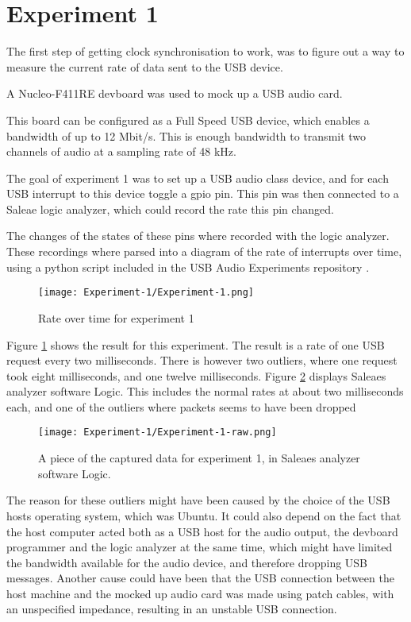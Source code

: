 \section{Experiment 1}

The first step of getting clock synchronisation to work, was to figure
out a way to measure the current rate of data sent to the USB device.

A Nucleo-F411RE devboard was used to mock up a USB audio card. 


This board can be configured as a Full Speed USB device, which enables a
bandwidth of up to 12 Mbit/s. This is enough bandwidth to transmit two
channels of audio at a sampling rate of 48 kHz.

The goal of experiment 1 was to set up a USB audio class device, and
for each USB interrupt to this device toggle a \acrshort{gpio} pin.
This pin was then connected to a Saleae logic analyzer, which could
record the rate this pin changed.

The changes of the states of these pins where recorded with the logic
analyzer. These recordings where parsed into a diagram of the rate of
interrupts over time, using a python script included in the USB Audio
Experiments repository \cite{github:usbAudioExperiments}.

\begin{figure}[h]
	\caption{Rate over time for experiment 1}
	\centering
	\texttt{[image: Experiment-1/Experiment-1.png]}
	\label{fig:experiment-1}
\end{figure}

Figure \ref{fig:experiment-1} shows the result for this experiment.
The result is a rate of one USB request every two milliseconds. There
is however two outliers, where one request took eight milliseconds,
and one twelve milliseconds. Figure \ref{fig:experiment-1-raw}
displays Saleaes analyzer software Logic. This includes the normal
rates at about two milliseconds each, and one of the outliers where
packets seems to have been dropped

\begin{figure}[h]
	\caption{A piece of the captured data for experiment 1, in Saleaes
	analyzer software Logic.}
	\centering
	\texttt{[image: Experiment-1/Experiment-1-raw.png]}
	\label{fig:experiment-1-raw}
\end{figure}

The reason for these outliers might have been caused by the choice of
the USB hosts operating system, which was Ubuntu. It could also depend
on the fact that the host computer acted both as a USB host for the
audio output, the devboard programmer and the logic analyzer at the
same time, which might have limited the bandwidth available for the
audio device, and therefore dropping USB messages. Another cause could
have been that the USB connection between the host machine and the
mocked up audio card was made using patch cables, with an unspecified
impedance, resulting in an unstable USB connection.
